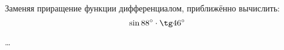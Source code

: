 \begin{problem}
Заменяя приращение функции дифференциалом, приближённо вычислить:
\[ \sin 88^{\circ}\cdot\tg 46^{\circ} \]
\end{problem}

\begin{solution}
  \dots
\end{solution}